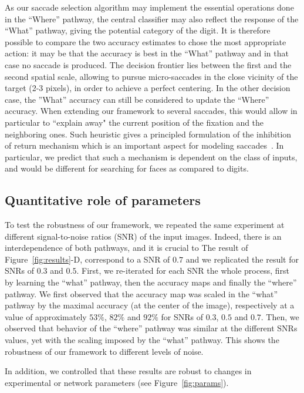 As our saccade selection algorithm may implement the essential operations done in the ``Where'' pathway, the central classifier may also reflect the response of the ``What'' pathway, giving the potential category of the digit. It is therefore possible to compare the two accuracy estimates to chose the most appropriate action: it may be that the accuracy is best in the ``What'' pathway and in that case no saccade is produced. The decision frontier lies between the first and the second spatial scale, allowing to pursue micro-saccades in the close vicinity of the target (2-3 pixels), in order to achieve a perfect centering.  In the other decision case, the ''What'' accuracy can still be considered to update the ``Where'' accuracy. When extending our framework to several saccades, this would allow in particular to ``explain away" the current position of the fixation and the neighboring ones. Such heuristic gives a principled formulation of the inhibition of return mechanism which is an important aspect for modeling saccades~\citep{Itti01}. In particular, we predict that such a mechanism is dependent on the class of inputs, and would be different for searching for faces as compared to digits. 

\subsection{Quantitative role of parameters}
To test the robustness of our framework, we repeated the same experiment at different signal-to-noise ratios (SNR) of the input images. Indeed, there is an interdependence of both pathways, and it is crucial to 
The result of Figure~\ref{fig:results}-D, correspond to a SNR of $0.7$ and we replicated the result for SNRs of $0.3$ and $0.5$. First, we re-iterated for each SNR the whole process, first by learning the ``what'' pathway, then the accuracy maps and finally the ``where'' pathway. We first observed that the accuracy map was scaled in the ``what'' pathway by the maximal accuracy (at the center of the image), respectively at a value of approximately $53\%$, $82\%$ and $92\%$ for SNRs of $0.3$, $0.5$ and $0.7$. Then, we observed that behavior of the ``where'' pathway was similar at the different SNRs values, yet with the scaling imposed by the ``what'' pathway. This shows the robustness of our framework to different levels of noise.

In addition, we controlled that these results are robust to changes in experimental or network parameters (see Figure~\ref{fig:params}). 

